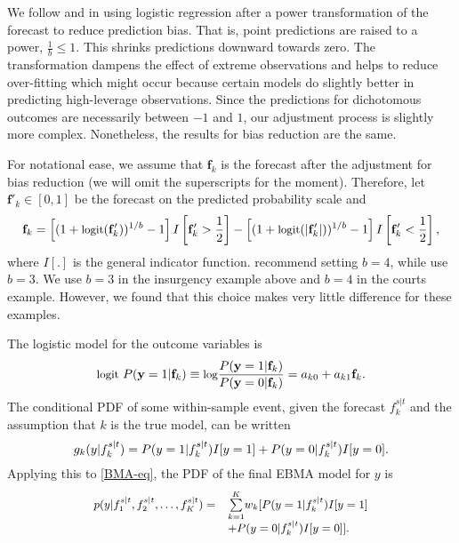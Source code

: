We follow \citet{Sloughter:2007} and \citet{Hamill:2004} in using
logistic regression after a power transformation of the forecast to
reduce prediction bias.  That is, point predictions are raised
to a power, $\frac{1}{b} \le 1$.  This shrinks predictions downward
towards zero.  The transformation dampens the effect of extreme
observations and helps to reduce over-fitting which might occur
because certain models do slightly better in predicting high-leverage
observations.  Since the predictions for dichotomous outcomes are
necessarily between $-1$ and $1$, our adjustment process is slightly
more complex.  Nonetheless, the results for bias reduction are the same.

For notational ease, we assume that $\mathbf{f}_k$ is the forecast
after the adjustment for bias reduction (we will omit the superscripts
for the moment).  Therefore, let $\mathbf{f}'_k \in [0,1]$ be the
forecast on the predicted probability scale and
\begin{equation}
\small
\mathbf{f}_k =  \left[(1+\mbox{logit}(\mathbf{f}'_k))^{1/b} - 1\right]I\left[\mathbf{f}'_k>\frac{1}{2}\right]  - \left[(1+\mbox{logit}(|\mathbf{f}'_k|))^{1/b} -  1\right]I\left[\mathbf{f}'_k<\frac{1}{2}\right],
 \end{equation}
 \noindent where $I[.]$ is the general indicator function.
 \citet{Hamill:2004} recommend setting $b=4$, while
 \citet{Sloughter:2007} use $b=3$.  We use $b=3$ in the insurgency
 example above and $b=4$ in the courts example.  However, we found
 that this choice makes very little difference for these examples.

The logistic model for the outcome variables is %
\begin{equation} \small
\label{one}
\mbox{logit } P(\mathbf{y}=1|\mathbf{f}_k) \equiv \mbox{log}\frac{P(\mathbf{y}=1|\mathbf{f}_k)}{P(\mathbf{y}=0|\mathbf{f}_k)} = a_{k0}+a_{k1}\mathbf{f}_k .
\end{equation}
\noindent The conditional PDF of some within-sample event, given the
forecast $f_{k}^{s|t}$ and the assumption that $k$ is the true model, can
be written
\begin{equation} 
\label{component-eq}
\small
g_k(y|f_{k}^{s|t}) = P(y=1|f_{k}^{s|t})I[y=1]  + P(y=0|f_{k}^{s|t})I[y=0].
\end{equation}
Applying this to \eqref{BMA-eq}, the PDF of the final EBMA model for
$y$ is
\begin{equation}
\label{pdf}
\small
\begin{array}{rl}
p(y|f_{1}^{s|t}, f_{2}^{s|t}, \ldots, f_{K}^{s|t}) = &
\overset{K}{\underset{k=1}{\sum}} w_k [
P(y=1|f_{k}^{s|t})I[y=1] \\
& + P(y=0|f_{k}^{s|t})I[y=0] ].\end{array}
\end{equation}



